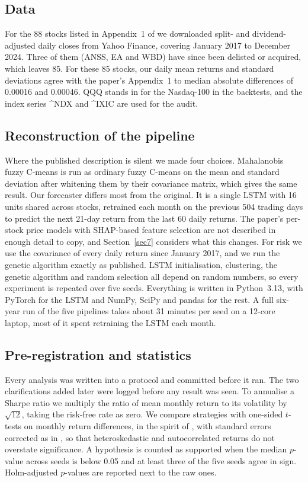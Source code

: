 \subsection{Data}

For the 88 stocks listed in Appendix~1 of \citet{dastkhan2026} we downloaded split- and dividend-adjusted daily closes from Yahoo Finance, covering January 2017 to December 2024. Three of them (ANSS, EA and WBD) have since been delisted or acquired, which leaves 85. For these 85 stocks, our daily mean returns and standard deviations agree with the paper's Appendix~1 to median absolute differences of 0.00016 and 0.00046. QQQ stands in for the Nasdaq-100 in the backtests, and the index series \textasciicircum{}NDX and \textasciicircum{}IXIC are used for the audit.

\subsection{Reconstruction of the pipeline}

Where the published description is silent we made four choices. Mahalanobis fuzzy C-means is run as ordinary fuzzy C-means on the mean and standard deviation after whitening them by their covariance matrix, which gives the same result. Our forecaster differs most from the original. It is a single LSTM with 16 units shared across stocks, retrained each month on the previous 504 trading days to predict the next 21-day return from the last 60 daily returns. The paper's per-stock price models with SHAP-based feature selection are not described in enough detail to copy, and Section~\ref{sec7} considers what this changes. For risk we use the covariance of every daily return since January 2017, and we run the genetic algorithm exactly as published. LSTM initialisation, clustering, the genetic algorithm and random selection all depend on random numbers, so every experiment is repeated over five seeds. Everything is written in Python~3.13, with PyTorch for the LSTM and NumPy, SciPy and pandas for the rest. A full six-year run of the five pipelines takes about 31 minutes per seed on a 12-core laptop, most of it spent retraining the LSTM each month.

\subsection{Pre-registration and statistics}

Every analysis was written into a protocol and committed before it ran. The two clarifications added later were logged before any result was seen. To annualise a Sharpe ratio \citep{sharpe1966} we multiply the ratio of mean monthly return to its volatility by $\sqrt{12}$, taking the risk-free rate as zero. We compare strategies with one-sided $t$-tests on monthly return differences, in the spirit of \citet{diebold1995}, with standard errors corrected as in \citet{newey1987}, so that heteroskedastic and autocorrelated returns do not overstate significance. A hypothesis is counted as supported when the median $p$-value across seeds is below 0.05 and at least three of the five seeds agree in sign. Holm-adjusted $p$-values are reported next to the raw ones.


